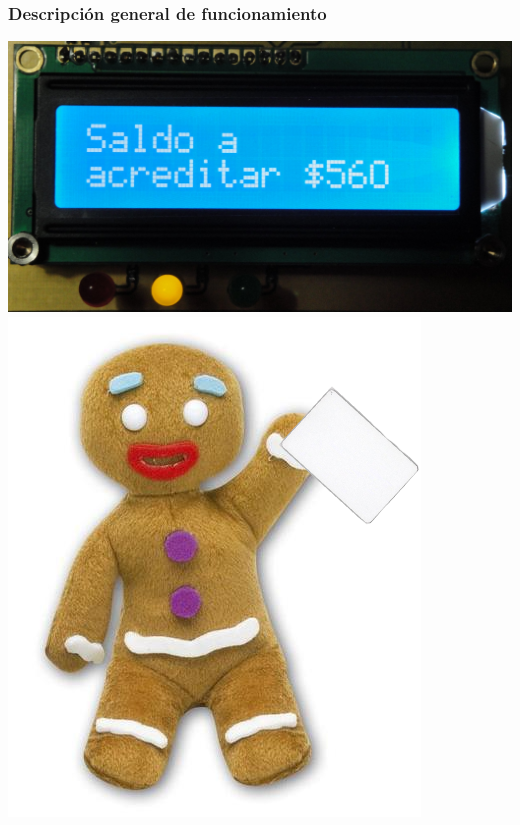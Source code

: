 \documentclass{beamer}
\begin{document}
\begin{frame}
	\frametitle{Descripción general de funcionamiento}
	\begin{center}
		\includegraphics[scale=.08]{Imagenes/saldoacreditar.jpg}
		\includegraphics[scale=.35]{Imagenes/pinpon_tarj.png}
	\end{center}
\end{frame}	
\end{document}
